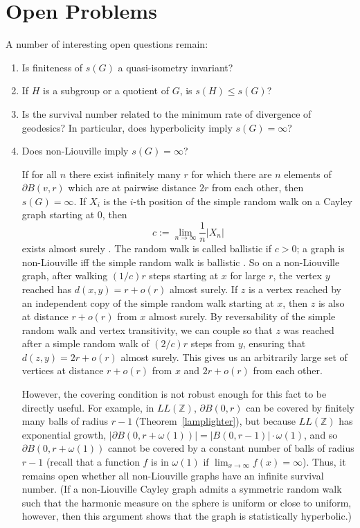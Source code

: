 \documentclass[11pt]{article}
\newcommand{\Z}{\mathbb{Z}}
\begin{document}

\section{Open Problems}
\label{sec:openquestions}

A number of interesting open questions remain:
\begin{enumerate}

\item Is finiteness of $s(G)$ a quasi-isometry invariant? 

\item If $H$ is a subgroup or a quotient of $G$, is $s(H) \leq s(G)$?

\item Is the survival number related to the minimum rate of divergence of geodesics? In particular, does hyperbolicity imply $s(G) = \infty$? 

\item Does non-Liouville imply $s(G) = \infty$? 

If for all $n$ there exist infinitely many $r$ for which there are $n$ elements of $\partial B(v,r)$ which are at pairwise distance $2r$ from each other, then $s(G) = \infty$. If $X_i$ is the $i$-th position of the simple random walk on a Cayley graph starting at 0, then 
$$c := \lim_{n \rightarrow \infty} \frac{1}{n} |X_n|$$ 
exists almost surely \cite{LLN}. The random walk is called ballistic if $c>0$; a graph is non-Liouville iff the simple random walk is ballistic \cite{KaimWoess}. So on a non-Liouville graph, after walking $(1/c)r$ steps starting at $x$ for large $r$, the vertex $y$ reached has $d(x,y) = r+o(r)$ almost surely. If $z$ is a vertex reached by an independent copy of the simple random walk starting at $x$, then $z$ is also at distance $r+o(r)$ from $x$ almost surely. By reversability of the simple random walk and vertex transitivity, we can couple so that $z$ was reached after a simple random walk of $(2/c)r$ steps from $y$, ensuring that $d(z,y) = 2r+o(r)$ almost surely. This gives us an arbitrarily large set of vertices at distance $r+o(r)$ from $x$ and $2r+o(r)$ from each other. 

However, the covering condition is not robust enough for this fact to be directly useful. For example, in $LL(\Z)$, $\partial B(0,r)$ can be covered by finitely many balls of radius $r-1$ (Theorem~\ref{lamplighter}), but because $LL(\Z)$ has exponential growth, $|\partial B(0, r+\omega(1))| = |B(0,r-1)| \cdot \omega(1)$, and so $\partial B(0,r+\omega(1))$ cannot be covered by a constant number of balls of radius $r-1$ (recall that a function $f$ is in $\omega(1)$ if $\lim_{x \rightarrow \infty} f(x) = \infty$). Thus, it remains open whether all non-Liouville graphs have an infinite survival number. (If a non-Liouville Cayley graph admits a symmetric random walk such that the harmonic measure on the sphere is uniform or close to uniform, however, then this argument shows that the graph is statistically hyperbolic.)


\end{enumerate}
\end{document}
